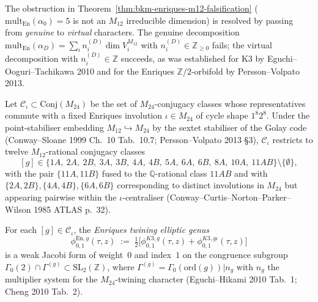\providecommand{\Mtw}{M_{12}}
\providecommand{\chitw}[1]{\chi^{(\Mtw)}_{#1}}
\providecommand{\phiEng}{\phi^{\mathrm{En},g}_{0,1}}
\providecommand{\phiKg}{\phi^{K3,g}_{0,1}}

The obstruction in Theorem~\textup{\ref{thm:bkm-enriques-m12-falsification}}
($\mathrm{mult}_{\mathrm{En}}(\alpha_0) = 5$ is not an $M_{12}$ irreducible
dimension) is resolved by passing from \emph{genuine} to
\emph{virtual} characters. The genuine decomposition
$\mathrm{mult}_{\mathrm{En}}(\alpha_D) = \sum_i n_i^{(D)}\dim V_i^{M_{12}}$
with $n_i^{(D)}\in\mathbb{Z}_{\geq 0}$ fails; the virtual decomposition
with $n_i^{(D)}\in\mathbb{Z}$ succeeds, as was established for K3 by
Eguchi--Ooguri--Tachikawa 2010 and for the Enriques $\mathbb{Z}/2$-orbifold
by Persson--Volpato 2013.

\begin{theorem}
\label{thm:bkm-enriques-m12-virtual}
Let $\mathcal{C}_{\iota} \subset \mathrm{Conj}(M_{24})$ be the set of
$M_{24}$-conjugacy classes whose representatives commute with a fixed
Enriques involution $\iota\in M_{24}$ of cycle shape $1^8 2^8$. Under
the point-stabiliser embedding $M_{12}\hookrightarrow M_{24}$ by the
sextet stabiliser of the Golay code (Conway--Sloane 1999 Ch.~10 Tab.~10.7;
Persson--Volpato 2013 \S 3), $\mathcal{C}_{\iota}$ restricts to twelve
$M_{12}$-rational conjugacy classes
\[
 [g]\in\{1A,\ 2A,\ 2B,\ 3A,\ 3B,\ 4A,\ 4B,\ 5A,\ 6A,\ 6B,\ 8A,\ 10A,\ 11AB\}\setminus\{\emptyset\},
\]
with the pair $\{11A,11B\}$ fused to the $\mathbb{Q}$-rational class
$11AB$ and with $\{2A,2B\},\{4A,4B\},\{6A,6B\}$ corresponding to distinct
involutions in $M_{24}$ but appearing pairwise within the
$\iota$-centraliser
(Conway--Curtis--Norton--Parker--Wilson 1985 ATLAS p.~32).

For each $[g]\in\mathcal{C}_{\iota}$, the \emph{Enriques twining elliptic
genus}
\[
 \phiEng(\tau, z)
 \;:=\;
 \tfrac{1}{2}\bigl[\phiKg(\tau,z) + \phi^{K3,g\iota}_{0,1}(\tau,z)\bigr]
\]
is a weak Jacobi form of weight~$0$ and index~$1$ on the congruence
subgroup $\Gamma_0(2)\cap\Gamma^{(g)}\subset\mathrm{SL}_2(\mathbb{Z})$,
where $\Gamma^{(g)} = \Gamma_0(\mathrm{ord}(g))|n_g$ with $n_g$ the
multiplier system for the $M_{24}$-twining character
(Eguchi--Hikami 2010 Tab.~1; Cheng 2010 Tab.~2).


\end{theorem}
